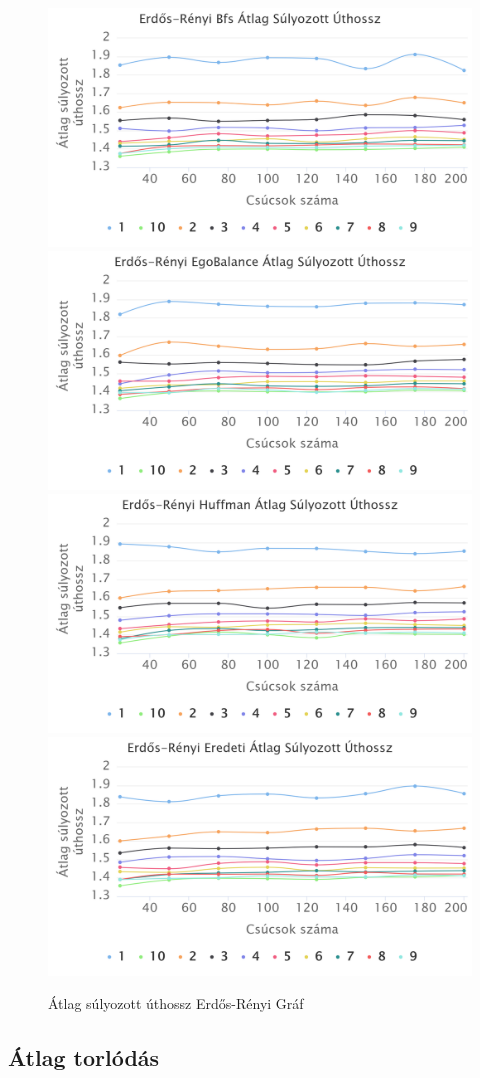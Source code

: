 \documentclass[12pt]{report}
\begin{document}
\begin{figure}[h]
	\begin{center}
		\includegraphics[width=0.49\linewidth]{pictures/erdos_avg_len_bfs.png}
		\includegraphics[width=0.49\linewidth]{pictures/erdos_avg_len_egobalance.png}
		\includegraphics[width=0.49\linewidth]{pictures/erdos_avg_len_huffman.png}
		\includegraphics[width=0.49\linewidth]{pictures/erdos_avg_len_original.png}
		\caption{Átlag súlyozott úthossz Erdős-Rényi Gráf}
		\label{avg-len}
	\end{center}
\end{figure}

\subsection{Átlag torlódás}
\end{document}
